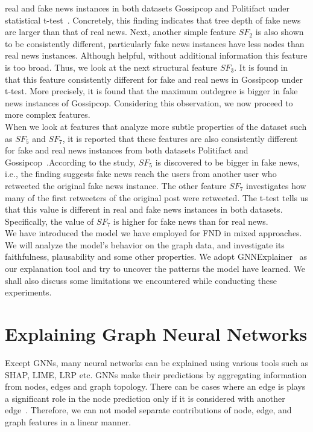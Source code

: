 real and fake news instances in both datasets Gossipcop and Politifact under statistical t-test~\parencite{HierarchicalPropagationNetworksForFND_Shu}. Concretely, this finding indicates that tree depth of fake news are larger
than that of real news. Next, another simple feature $SF_2$ is also shown to be consistently different, particularly fake news instances have less nodes than real news instances. Although helpful, without additional information this feature is
too broad. Thus, we look at the next structural feature $SF_3$. It is found in~\parencite{HierarchicalPropagationNetworksForFND_Shu} that this feature consistently different for fake and real news in Gossipcop under t-test. More precisely, it is found that the maximum outdegree is bigger in fake news instances of Gossipcop. Considering this observation, we now proceed to more complex features.\\
When we look at features that analyze more subtle properties of the dataset such as $SF_5$ and $SF_7$, it is reported that these features are also consistently different for fake and real news instances from both datasets Politifact and Gossipcop~\parencite{HierarchicalPropagationNetworksForFND_Shu}.According to the study, $SF_5$ is discovered to be bigger in fake news, i.e., the finding suggests fake news reach the users from another user who retweeted the original fake news instance. The other feature $SF_7$ investigates how many of the first retweeters of the original post were retweeted. The t-test tells us that this value is different in real and fake news instances in both datasets. Specifically, the value of $SF_7$ is higher for fake news than for real news.\\

We have introduced the model we have employed for FND in mixed approaches. We will analyze the model's behavior on the graph data, and investigate its faithfulness, plausability and some other properties. We adopt GNNExplainer~\parencite{GNNExplainer_Ying} as our explanation tool and try to uncover the patterns the model have learned. We shall also discuss some limitations we encountered while conducting these experiments.

\section{Explaining Graph Neural Networks}
\label{sec:ExplainingGNNs}
Except GNNs, many neural networks can be explained using various tools such as SHAP, LIME, LRP etc. GNNs
make their predictions by aggregating information from nodes, edges and graph topology. There can be cases where an edge
is plays a significant role in the node prediction only if it is considered with another edge~\parencite{CNNsOnGraphsForLearningMolecularFingerprints_Duvenaud}. Therefore, we can not model separate contributions of node,
edge, and graph features in a linear manner.\\

